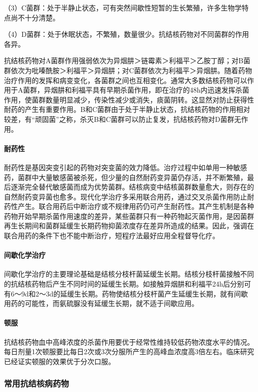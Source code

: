 （3）C菌群：处于半静止状态，可有突然间歇性短暂的生长繁殖，许多生物学特点尚不十分清楚。

（4）D菌群：处于休眠状态，不繁殖，数量很少。抗结核药物对不同菌群的作用各异。

抗结核药物对A菌群作用强弱依次为异烟肼＞链霉素＞利福平＞乙胺丁醇；对B菌群依次为吡嗪酰胺＞利福平＞异烟肼；对C菌群依次为利福平＞异烟肼。随着药物治疗作用的发挥和病变变化，各菌群之间也互相变化。通常大多数结核药物可以作用于A菌群，异烟肼和利福平具有早期杀菌作用，即在治疗的48h内迅速发挥杀菌作用，使菌群数量明显减少，传染性减少或消失，痰菌阴转。这显然对防止获得性耐药的产生有重要作用。B和C菌群由于处于半静止状态，抗结核药物的作用相对较差，有“顽固菌”之称，杀灭B和C菌群可以防止复发，抗结核药物对D菌群无作用。
\paragraph{耐药性}

耐药性是基因突变引起的药物对突变菌的效力降低。治疗过程中如单用一种敏感药，菌群中大量敏感菌被杀死，但少量的自然耐药变异菌仍存活，并不断繁殖，最后逐渐完全替代敏感菌而成为优势菌群。结核病变中结核菌群数量愈大，则存在的自然耐药变异菌也愈多。现代化学治疗多采用联合用药，通过交叉杀菌作用防止耐药性产生。联合用药后中断治疗或不规律用药仍可产生耐药性。其产生机制是各种药物开始早期杀菌作用速度的差异，某些菌群只有一种药物起灭菌作用，是因菌群再生长期间和菌群延缓生长期药物抑菌浓度存在差异所造成的结果。因此，强调在联合用药的条件下也不能中断治疗，短程疗法最好应用全程督导化疗。
\paragraph{间歇化学治疗}

间歇化学治疗的主要理论基础是结核分枝杆菌延缓生长期。结核分枝杆菌接触不同的抗结核药物后产生不同时间的延缓生长期。如接触异烟肼和利福平24h后分别可有6～9d和2～3d的延缓生长期。药物使结核分枝杆菌产生延缓生长期，就有间歇用药的可能性，而氨硫脲没有延缓生长期，就不适于间歇应用。
\paragraph{顿服}

抗结核药物血中高峰浓度的杀菌作用要优于经常性维持较低药物浓度水平的情况。每日剂量1次顿服要比每日2次或3次分服所产生的高峰血浓度高3倍左右。临床研究已经证实顿服的效果优于分次口服。

\subsubsection{常用抗结核病药物}
